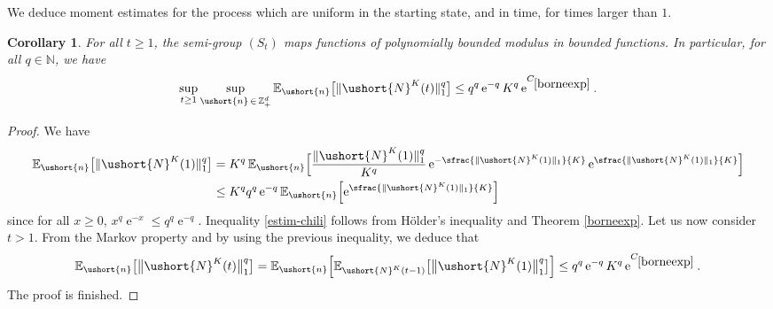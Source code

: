 \documentclass[10pt]{amsart}
\numberwithin{equation}{section}
\theoremstyle{plain}
\newtheorem{corollary}[theorem]{Corollary}
\theoremstyle{definition}
\newcommand{\cte}[1]{C_{\eqref{#1}}}
\newcommand{\E}{{\mathbb{E}}}
\newcommand{\zentiers}{{\mathbb{Z}}}
\newcommand{\integers}{\mathbb{N}}
\newcommand{\sdomaine}{{\zentiers}_+^d}
\newcommand{\vecn}{\ushort{n}}
\newcommand{\leproc}{\ushort{N}^{K}}
\newcommand{\sleproc}{\ushort{N}^{K}}
\newcommand{\e}{\operatorname{e}}
\begin{document}
We deduce moment estimates for the process which are uniform in the starting state, and in time, for times larger than $1$.
\begin{corollary}\label{auxbornees}
For all $t\ge1$, the semi-group $(S_{t})$ maps functions of polynomially bounded modulus in bounded
functions.
In particular, for all $q\in\integers$, we have
\begin{equation}
\label{estim-chili}
\sup_{t\geq 1}\sup_{\vecn\,\in\, \sdomaine} \E_{\vecn} \bigl[\|\leproc(t)\|_1^{q}\bigr]
\leq q^q \e^{-q} K^q \e^{\cte{borneexp}}.
\end{equation}
\end{corollary}
\begin{proof}
We have
\begin{align*}
\E_{\vecn} \bigl[\|\leproc(1)\|_1^{q}\bigr]
& = K^q\, \E_{\vecn}\Bigl[\frac{\|\leproc(1)\|_1^{q}}{K^q} \e^{-\sfrac{\|\sleproc(1)\|_{1}}{K}} \e^{\sfrac{\|\sleproc(1)\|_{1}}{K}}\Bigr]\\
& \leq K^q q^q \e^{-q} \E_{\vecn} \Bigl[\e^{\sfrac{\|\sleproc(1)\|_{1}}{K}}\Bigr]
\end{align*}
since for all $x\geq 0$, $x^q \e^{-x}\leq q^q \e^{-q}$.
Inequality \eqref{estim-chili} follows from Hölder's inequality and Theorem \ref{borneexp}.
Let us now consider $t> 1$. From the Markov property and by using the previous inequality, we deduce that
\[
\E_{\vecn}\bigl[\big\|\leproc(t)\big\|_1^{q}\bigr]
= \E_{\vecn}\Bigl[\E_{\sleproc(t-1)}\bigl[\big\|\leproc(1)\big\|^{q}_1\bigr]\Bigr]
\le q^q \e^{-q} K^q \e^{\cte{borneexp}}.
\]
The proof is finished.
\end{proof}
\end{document}
